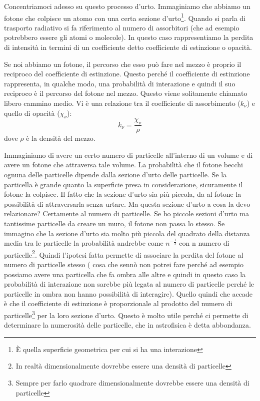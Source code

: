 \documentclass[a4paper,11pt]{article}
\begin{document}
    Concentriamoci adesso su questo processo d'urto. Immaginiamo che abbiamo un fotone che colpisce un atomo con una certa sezione d'urto\footnote{È quella superficie geometrica per cui si ha una interazione}. Quando si parla di trasporto radiativo si fa riferimento al numero di assorbitori (che ad esempio potrebbero essere gli atomi o molecole). In questo caso rappresentiamo la perdita di intensità in termini di un coefficiente detto coefficiente di estinzione o opacità. 
    
    Se noi abbiamo un fotone, il percorso che esso può fare nel mezzo è proprio il reciproco del coefficiente di estinzione. Questo perché il coefficiente di estinzione rappresenta, in qualche modo, una probabilità di interazione e quindi il suo reciproco è il percorso del fotone nel mezzo. Questo viene solitamente chiamato libero cammino medio. Vi è una relazione tra il coefficiente di assorbimento ($k_\nu$) e quello di opacità ($\chi_\nu$):
    $$
        k_\nu = \frac{\chi_\nu}{\rho}
    $$
    dove $\rho$ è la densità del mezzo.
    
    Immaginiamo di avere un certo numero di particelle all'interno di un volume e di avere un fotone che attraversa tale volume. La probabilità che il fotone becchi ognuna delle particelle dipende dalla sezione d'urto delle particelle. Se la particella è grande quanto la superficie presa in considerazione, sicuramente il fotone la colpisce. Il fatto che la sezione d'urto sia più piccola, da al fotone la possibilità di attraversarla senza urtare. Ma questa sezione d'urto a cosa la devo relazionare? Certamente al numero di particelle. Se ho piccole sezioni d'urto ma tantissime particelle da creare un muro, il fotone non passa lo stesso. Se immagino che la sezione d'urto sia molto più piccola del quadrato della distanza media tra le particelle la probabilità andrebbe come $n^{-\frac{1}{3}}$ con n numero di particelle\footnote{In realtà dimensionalmente dovrebbe essere una densità di particelle}. Quindi l'ipotesi fatta permette di associare la perdita del fotone al numero di particelle stesso ( cosa che sennò non potrei fare perché ad esempio possiamo avere una particella che fa ombra alle altre e quindi in questo caso la probabilità di interazione non sarebbe più legata al numero di particelle perché le particelle in ombra non hanno possibilità di interagire). Quello quindi che accade è che il coefficiente di estinzione è proporzionale al prodotto del numero di particelle\footnote{Sempre per farlo quadrare dimensionalmente dovrebbe essere una densità di particelle} per la loro sezione d'urto. Questo è molto utile perché ci permette di determinare la numerosità delle particelle, che in astrofisica è detta abbondanza. 
    
\end{document}
